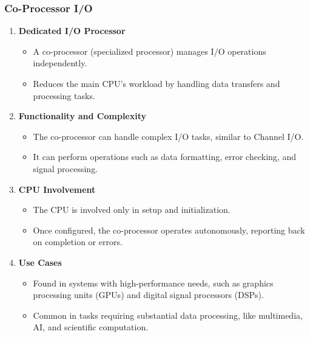 \begin{frame}
    \frametitle{Co-Processor I/O}
    \begin{enumerate}
        \item \textbf{Dedicated I/O Processor}
            \begin{itemize}
                \item A co-processor (specialized processor) manages I/O operations independently.
                \item Reduces the main CPU’s workload by handling data transfers and processing tasks.
            \end{itemize}
        
        \item \textbf{Functionality and Complexity}
            \begin{itemize}
                \item The co-processor can handle complex I/O tasks, similar to Channel I/O.
                \item It can perform operations such as data formatting, error checking, and signal processing.
            \end{itemize}
        
        \item \textbf{CPU Involvement}
            \begin{itemize}
                \item The CPU is involved only in setup and initialization.
                \item Once configured, the co-processor operates autonomously, reporting back on completion or errors.
            \end{itemize}
        
        \item \textbf{Use Cases}
            \begin{itemize}
                \item Found in systems with high-performance needs, such as graphics processing units (GPUs) and digital signal processors (DSPs).
                \item Common in tasks requiring substantial data processing, like multimedia, AI, and scientific computation.
            \end{itemize}
    \end{enumerate}
\end{frame}

